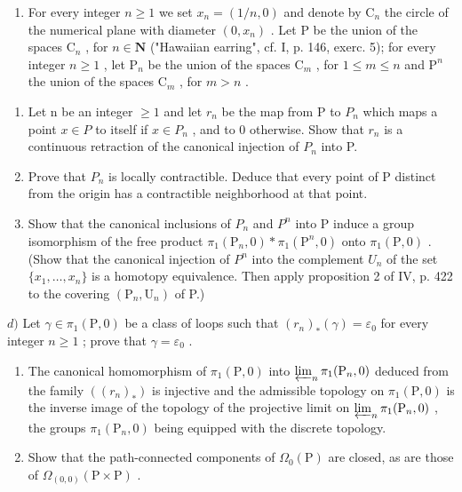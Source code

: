 \begin{enumerate}
\def\labelenumi{\arabic{enumi})}
\setcounter{enumi}{5}
\tightlist
\item
  For every integer \(n \geqslant 1\) we set \(x_{n} = (1/n,0)\) and denote by \(\mathrm{C}_{n}\) the circle of the numerical plane with diameter \((0,x_{n})\) . Let P be the union of the spaces \(\mathrm{C}_{n}\) , for \(n \in \mathbf{N}\) ("Hawaiian earring", cf. I, p. 146, exerc. 5); for every integer \(n \geqslant 1\) , let \(\mathrm{P}_{n}\) be the union of the spaces \(\mathrm{C}_{m}\) , for \(1 \leqslant m \leqslant n\) and \(\mathrm{P}^{n}\) the union of the spaces \(\mathrm{C}_{m}\) , for \(m > n\) .
\end{enumerate}

\begin{enumerate}
\def\labelenumi{\alph{enumi})}
\item
  Let n be an integer \(\geqslant 1\) and let \(r_{n}\) be the map from P to \(P_{n}\) which maps a point \(x \in P\) to itself if \(x \in P_{n}\) , and to 0 otherwise. Show that \(r_{n}\) is a continuous retraction of the canonical injection of \(P_{n}\) into P.
\item
  Prove that \(P_{n}\) is locally contractible. Deduce that every point of P distinct from the origin has a contractible neighborhood at that point.
\item
  Show that the canonical inclusions of \(P_{n}\) and \(P^{n}\) into P induce a group isomorphism of the free product \(\pi_{1}(\mathrm{P}_{n},0)*\pi_{1}(\mathrm{P}^{n},0)\) onto \(\pi_{1}(\mathrm{P},0)\) . (Show that the canonical injection of \(P^{n}\) into the complement \(U_{n}\) of the set \(\{x_{1},\ldots,x_{n}\}\) is a homotopy equivalence. Then apply proposition 2 of IV, p. 422 to the covering \((\mathrm{P}_{n},\mathrm{U}_{n})\) of P.)
\end{enumerate}

\(d)\) Let \(\gamma \in \pi_1(\mathrm{P},0)\) be a class of loops such that \((r_n)_*(\gamma) = \varepsilon_0\) for every integer \(n \geqslant 1\) ; prove that \(\gamma = \varepsilon_0\) .

\begin{enumerate}
\def\labelenumi{\alph{enumi})}
\setcounter{enumi}{4}
\item
  The canonical homomorphism of \(\pi_1(\mathrm{P},0)\) into \(\varprojlim_{n}\pi_{1}(\mathrm{P}_{n},0)\) deduced from the family \(((r_n)_*)\) is injective and the admissible topology on \(\pi_1(\mathrm{P},0)\) is the inverse image of the topology of the projective limit on \(\varprojlim_{n}\pi_{1}(\mathrm{P}_{n},0)\) , the groups \(\pi_1(\mathrm{P}_n,0)\) being equipped with the discrete topology.
\item
  Show that the path-connected components of \(\Omega_{0}(\mathrm{P})\) are closed, as are those of \(\Omega_{(0,0)}(\mathrm{P} \times \mathrm{P})\) .
\end{enumerate}

